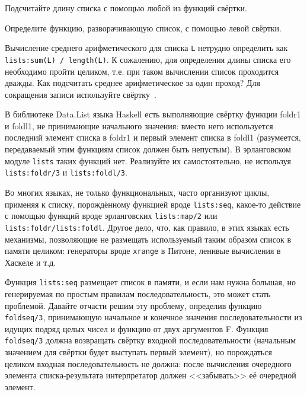\documentclass[
  paper=a4,
  fontsize=14pt,
  openany,
  appendixprefix=true
]{scrbook}
\begin{document}

\begin{problem}\label{length}
Подсчитайте длину списка с помощью любой из функций свёртки.
\end{problem}

\begin{problem}\label{foldrev}
Определите функцию, разворачивающую список, с помощью левой свёртки.~\cite[2.39]{SICP}
\end{problem}

\begin{problem}\label{mean}
Вычисление среднего арифметического для списка \lstinline{L} нетрудно определить как \lstinline{lists:sum(L) / length(L)}. К сожалению, для определения длины списка его необходимо пройти целиком, т.е. при таком вычислении список проходится дважды. Как подсчитать среднее арифметическое за один проход? Для сокращения записи используйте свёртку~\cite{Beshenov}.
\end{problem}

\begin{problem}\label{foldl1}
В библиотеке Data.List языка Haskell есть выполняющие свёртку функции foldr1 и foldl1, не принимающие начального значения: вместо него используется последний элемент списка в foldr1 и первый элемент списка в foldl1 (разумеется, передаваемый этим функциям список должен быть непустым). В эрланговском модуле \lstinline{lists} таких функций нет. Реализуйте их самостоятельно, не используя \lstinline{lists:foldr/3} и \lstinline{lists:foldl/3}.
\end{problem}

\begin{problem}\label{foldseq}
Во многих языках, не только функциональных, часто организуют циклы, применяя к списку, порождённому функцией вроде \lstinline{lists:seq}, какое-то действие с помощью функций вроде эрланговских \lstinline{lists:map/2} или \lstinline{lists:foldr/lists:foldl}. Другое дело, что, как правило, в этих языках есть механизмы, позволяющие не размещать используемый таким образом список в памяти целиком: генераторы вроде \lstinline{xrange} в Питоне, ленивые вычисления в Хаскеле и т.д.

Функция \lstinline{lists:seq} размещает список в памяти, и если нам нужна большая, но генерируемая по простым правилам последовательность, это может стать проблемой. Давайте отчасти решим эту проблему, определив функцию \lstinline{foldseq/3}, принимающую начальное и конечное значения последовательности из идущих подряд целых чисел и функцию от двух аргументов F. Функция \lstinline{foldseq/3} должна возвращать свёртку входной последовательности (начальным значением для свёртки будет выступать первый элемент), но порождаться целиком входная последовательность не должна: после вычисления очередного элемента списка-результата интерпретатор должен <<забывать>> её очередной элемент.
\end{problem}
\end{document}
